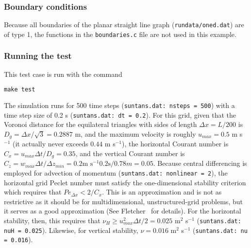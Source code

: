\subsubsection{Boundary conditions}

Because all boundaries of the planar
straight line graph (\verb+rundata/oned.dat+) are of type 1, the functions in the \verb+boundaries.c+ file are
not used in this example.

\subsubsection{Running the test}

This test case is run with the command
\begin{verbatim}
make test
\end{verbatim}
The simulation runs for 500 time steps (\verb+suntans.dat: nsteps = 500+) with a time step size of 0.2 s (\verb+suntans.dat: dt = 0.2+).
For this grid, given that the Voronoi distance for the equilateral triangles with sides of length $\Delta x=L/200$
is $D_g = \Delta x/\sqrt{3} = 0.2887$ m, and the maximum velocity is roughly $u_{max}=0.5$ m s$^{-1}$ (it actually
never exceeds $0.44$ m s$^{-1}$),
the horizontal Courant number is $C_x=u_{max}\Delta t/D_g = 0.35$, and the vertical Courant number is
$C_z=w_{max}\Delta t/\Delta z_{min}=0.2\mbox{m s}^{-1} 0.2\mbox{s}/0.78 m=0.05$.  Because central differencing
is employed for advection of momentum (\verb+suntans.dat: nonlinear = 2+), 
the horizontal grid Peclet number must satisfy the one-dimensional stability criterion which requires
that  $Pe_{\Delta x}<2/C_x$.  This is an approximation and is not as restrictive as it should be for multidimensional,
unstructured-grid problems, but it serves as a good approximation (See Fletcher~\cite{FLETCHER[1997]} for details).
For the horizontal stability, then, this requires that $\nu_H\ge u_{max}^2\Delta t/2 = 0.025$ m$^2$ s$^{-1}$ (\verb+suntans.dat: nuH = 0.025+).
Likewise, for vertical stability, $\nu = 0.016$  m$^2$ s$^{-1}$ (\verb+suntans.dat: nu = 0.016+).

